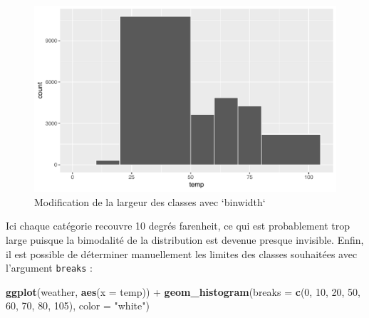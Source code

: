 \documentclass[a4paperpaper,]{article}
\newenvironment{Shaded}{\begin{snugshade}}{\end{snugshade}}
\newcommand{\DataTypeTok}[1]{\textcolor[rgb]{0.00,0.34,0.68}{#1}}
\newcommand{\DecValTok}[1]{\textcolor[rgb]{0.69,0.50,0.00}{#1}}
\newcommand{\KeywordTok}[1]{\textcolor[rgb]{0.12,0.11,0.11}{\textbf{#1}}}
\newcommand{\NormalTok}[1]{\textcolor[rgb]{0.12,0.11,0.11}{#1}}
\newcommand{\OperatorTok}[1]{\textcolor[rgb]{0.12,0.11,0.11}{#1}}
\newcommand{\StringTok}[1]{\textcolor[rgb]{0.75,0.01,0.01}{#1}}
\theoremstyle{definition}
\theoremstyle{definition}
\theoremstyle{definition}
\theoremstyle{remark}
\begin{document}
\begin{figure}[htpb]

{\centering \includegraphics[width=0.9\linewidth]{figure/unnamed-chunk-51-1} 

}

\caption{Modification de la largeur des classes avec `binwidth`}\label{fig:unnamed-chunk-51}
\end{figure}

Ici chaque catégorie recouvre 10 degrés farenheit, ce qui est
probablement trop large puisque la bimodalité de la distribution est
devenue presque invisible. Enfin, il est possible de déterminer
manuellement les limites des classes souhaitées avec l'argument
\texttt{breaks} :

\begin{Shaded}
\begin{Highlighting}[]
\KeywordTok{ggplot}\NormalTok{(weather, }\KeywordTok{aes}\NormalTok{(}\DataTypeTok{x =}\NormalTok{ temp)) }\OperatorTok{+}
\StringTok{  }\KeywordTok{geom_histogram}\NormalTok{(}\DataTypeTok{breaks =} \KeywordTok{c}\NormalTok{(}\DecValTok{0}\NormalTok{, }\DecValTok{10}\NormalTok{, }\DecValTok{20}\NormalTok{, }\DecValTok{50}\NormalTok{, }\DecValTok{60}\NormalTok{, }\DecValTok{70}\NormalTok{, }\DecValTok{80}\NormalTok{, }\DecValTok{105}\NormalTok{), }\DataTypeTok{color =} \StringTok{"white"}\NormalTok{)}
\end{Highlighting}
\end{Shaded}
\end{document}
